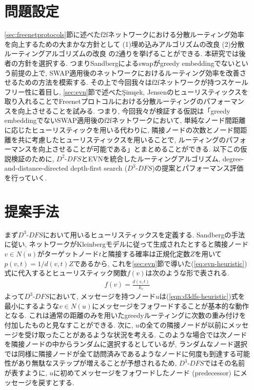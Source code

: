 \documentclass[dvipdfmx]{ampbt}
\begin{document}
\section{問題設定}
\ref{sec:freenetprotocols}節に述べた\acrshort{f2f}ネットワークにおける分散ルーティング効率を向上するための大まかな方針として (1)埋め込みアルゴリズムの改良 (2)分散ルーティングアルゴリズムの改良 の2通りを挙げることができる. 本研究では後者の方針を選択する. つまりSandbergによる\gls{swap}がgreedy embeddingでないという前提の上で, SWAP適用後のネットワークにおけるルーティング効率を改善させるための方法を模索する. \newline
その上で今回我々は\acrshort{f2f}ネットワークが持つスケールフリー性に着目し, \ref{sec:evn}節で述べた{\c{S}}im{\c{s}}ek, Jensenのヒューリスティックスを取り入れることでFreenetプロトコルにおける分散ルーティングのパフォーマンスを向上させることを試みる. つまり, 今回我々が検証する仮説は「greedy embeddingでないSWAP適用後の\acrshort{f2f}ネットワークにおいて, 単純なノード間距離に応じたヒューリスティックを用いる代わりに, 隣接ノードの次数とノード間距離を共に考慮したヒューリスティックスを用いることで, ルーティングのパフォーマンスを向上させることが可能である」とまとめることができる. 以下この仮説検証のために, $D^2$-$DFS$とEVNを統合したルーティングアルゴリズム, degree-and-distance-directed depth-first search ($D^3$-$DFS$)の提案とパフォーマンス評価を行っていく. 
\section{提案手法}
まず$D^3$-$DFS$において用いるヒューリスティックスを定義する. Sandbergの手法に従い, ネットワークがKleinbergモデルに従って生成されたとすると隣接ノード$v \in N(u)$がターゲットノード$t$と隣接する確率は正規化定数$Z$を用いて$p(v,t) = 1/d(v,t)Z$であるから, これを\ref{sec:evn}節で導いた(\ref{eq:evn-heuristic})式に代入するとヒューリスティック関数$f(v)$は次のような形で表される.
\begin{eqnarray}
f(v) = \frac{d(v,t)}{k_v} \label{eqn:d3dfs-heuristic}
\end{eqnarray}
よって$D^3$-$DFS$において, メッセージを持つノード$u$は(\ref{eqn:d3dfs-heuristic})式を最小にするような$v \in N(u)$にメッセージをフォワードすることが基本的な動作となる. これは通常の距離のみを用いたgreedyルーティングに次数の重み付けを付加したものと見なすことができる. \newline
次に, $u$の全ての隣接ノードが以前にメッセージを受け取ったことがあるような状況を考える. このような場合\cite{csimsek2008navigating}では次ノードを隣接ノードの中からランダムに選択するとしているが, ランダムなノード選択では同様に隣接ノードが全て訪問済みであるようなノードに何度も到達する可能性があり無駄なステップが増えることが予想されるため, $D^3$-$DFS$ではその名前が表すように, $u$に初めてメッセージをフォワードしたノード (predecessor) にメッセージを戻すとする.  \newline
\end{document}
